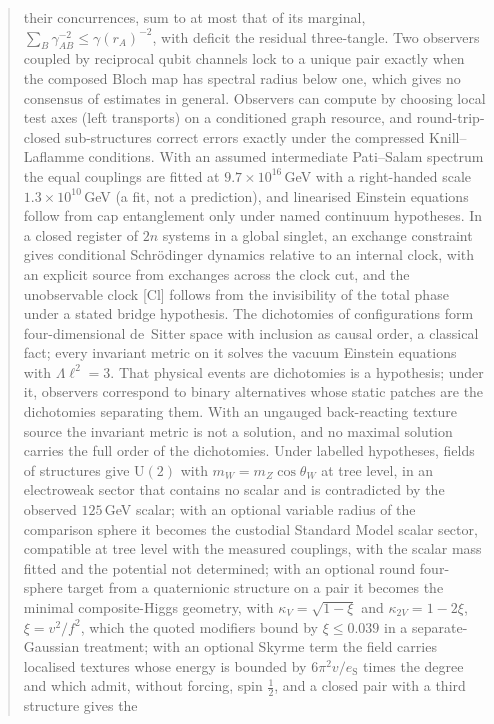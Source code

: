 \documentclass[aps,pra,onecolumn,superscriptaddress,nofootinbib,10pt]{revtex4-2}
\theoremstyle{definition}
\theoremstyle{remark}
\newcommand{\U}{\mathrm{U}}
\begin{document}
\begin{abstract}
their concurrences, sum to at most that of its marginal, $\sum_B\gamma_{AB}^{-2}\le\gamma(r_A)^{-2}$, with deficit the residual three-tangle.
Two observers coupled by reciprocal qubit channels lock to a unique pair exactly when the composed Bloch
map has spectral radius below one, which gives no consensus of estimates in general.  Observers can compute by choosing local test axes (left transports) on a conditioned graph resource, and
round-trip-closed sub-structures correct errors exactly under the compressed Knill--Laflamme conditions.
With an assumed intermediate Pati--Salam spectrum the equal couplings are fitted at
$9.7\times10^{16}$\,GeV with a right-handed scale $1.3\times10^{10}$\,GeV (a fit, not a prediction), and linearised Einstein
equations follow from cap entanglement only under named continuum hypotheses.  In a closed register of $2n$ systems in a global singlet, an
exchange constraint gives conditional Schr\"odinger dynamics relative to an internal clock, with an
explicit source from exchanges across the clock cut, and the unobservable clock [Cl] follows from the
invisibility of the total phase under a stated bridge hypothesis.  The dichotomies of configurations form four-dimensional
de~Sitter space with inclusion as causal order, a classical fact; every invariant metric on it solves
the vacuum Einstein equations with $\Lambda\ell^2=3$.  That physical events are dichotomies is a hypothesis; under
it, observers correspond to binary alternatives whose static patches are the dichotomies separating them.  With an ungauged
back-reacting texture source the invariant metric is not a solution, and no maximal solution carries the
full order of the dichotomies.  Under labelled hypotheses, fields of
structures give $\U(2)$ with $m_W=m_Z\cos\theta_W$ at tree level, in an electroweak sector that contains no
scalar and is contradicted by the observed $125$\,GeV scalar; with an optional variable radius of the
comparison sphere it becomes the custodial Standard Model scalar sector, compatible at tree level with
the measured couplings, with the scalar mass fitted and the potential not determined;
with an optional round four-sphere target from a quaternionic structure on a pair it becomes the minimal
composite-Higgs geometry, with $\kappa_V=\sqrt{1-\xi}$ and $\kappa_{2V}=1-2\xi$, $\xi=v^2/f^2$, which the quoted modifiers bound by
$\xi\le0.039$ in a separate-Gaussian treatment;
with an optional Skyrme term the field carries localised textures whose energy is bounded by
$6\pi^2v/e_{\mathrm S}$ times the degree and which admit, without forcing, spin $\tfrac12$, and a closed pair with a third structure gives the

\end{abstract}
\end{document}
